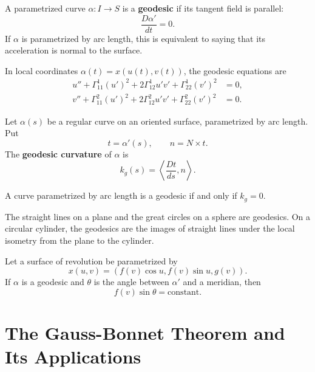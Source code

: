 \documentclass[12pt, oneside]{book}
\begin{document}
\begin{definition}
    A parametrized curve $\alpha:I\rightarrow S$ is a \textbf{geodesic} if its
    tangent field is parallel:
    \[
        \frac{D\alpha'}{dt}=0.
    \]
    If $\alpha$ is parametrized by arc length, this is equivalent to saying that
    its acceleration is normal to the surface.
\end{definition}

\begin{remark}
    In local coordinates $\alpha(t)=x(u(t),v(t))$, the geodesic equations are
    \[
        \begin{aligned}
            u''+\Gamma_{11}^1(u')^2
            +2\Gamma_{12}^1u'v'
            +\Gamma_{22}^1(v')^2 & =0,  \\
            v''+\Gamma_{11}^2(u')^2
            +2\Gamma_{12}^2u'v'
            +\Gamma_{22}^2(v')^2 & =0 .
        \end{aligned}
    \]
\end{remark}

\begin{definition}
    Let $\alpha(s)$ be a regular curve on an oriented surface, parametrized by
    arc length.  Put
    \[
        t=\alpha'(s),\qquad n=N\times t .
    \]
    The \textbf{geodesic curvature} of $\alpha$ is
    \[
        k_g(s)=\left\langle \frac{Dt}{ds},n\right\rangle .
    \]
\end{definition}

\begin{proposition}
    A curve parametrized by arc length is a geodesic if and only if
    $k_g=0$.
\end{proposition}

\begin{example}
    The straight lines on a plane and the great circles on a sphere are
    geodesics.  On a circular cylinder, the geodesics are the images of straight
    lines under the local isometry from the plane to the cylinder.
\end{example}

\begin{example}
    Let a surface of revolution be parametrized by
    \[
        x(u,v)=(f(v)\cos u,f(v)\sin u,g(v)).
    \]
    If $\alpha$ is a geodesic and $\theta$ is the angle between $\alpha'$ and a
    meridian, then
    \[
        f(v)\sin\theta=\text{constant}.
    \]
\end{example}

\section{The Gauss-Bonnet Theorem and Its Applications}
\end{document}
